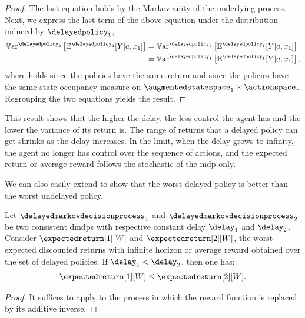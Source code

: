 \begin{proof}
    The last equation holds by the Markovianity of the underlying process. 
    Next, we express the last term of the above equation under the distribution induced by $\delayedpolicy_1$,
    \begin{align}
        \mathbb{V}\mathrm{ar}^{\delayedpolicy_2}\left[\mathbb{E}^{\delayedpolicy_2}[Y\vert a,x_1]\right] 
        &= \mathbb{V}\mathrm{ar}^{\delayedpolicy_2}\left[\mathbb{E}^{\delayedpolicy_1}[Y\vert a,x_1]\right]\label{eq:same_return_f}
        \\
        &= \mathbb{V}\mathrm{ar}^{\delayedpolicy_1}\left[\mathbb{E}^{\delayedpolicy_1}[Y\vert a,x_1]\right]\label{eq:same_distrib_f},
    \end{align}
    where  holds since the policies have the same return and  since the policies have the same state occupancy measure on $\augmentedstatespace_1\times\actionspace$. 
    Regrouping the two equations yields the result.
\end{proof}

This result shows that the higher the delay, the less control the agent has and the lower the variance of its return is. 
The range of returns that a delayed policy can get shrinks as the delay increases.
In the limit, when the delay grows to infinity, the agent no longer has control over the sequence of actions, and the expected return or average reward follows the stochastic of the \gls{mdp} only. 

We can also easily extend  to show that the worst delayed policy is better than the worst undelayed policy.

\begin{coroll}
\label{th:inverse_perf_delay_vector_all_weight}
    Let $\delayedmarkovdecisionprocess_{1}$ and $\delayedmarkovdecisionprocess_{2}$ be two consistent \glspl{dmdp} with respective constant delay $\delay_1$ and $\delay_2$.
    Consider $\expectedreturn[1][W]$ and $\expectedreturn[2][W]$, the worst expected discounted returns with infinite horizon or average reward obtained over the set of delayed policies.
    If $\delay_1<\delay_2$, then one has:
    \begin{align*}
        \expectedreturn[1][W] \le \expectedreturn[2][W].
    \end{align*}
\end{coroll}
\begin{proof}
    It suffices to apply  to the process in which the reward function is replaced by its additive inverse.
\end{proof}

